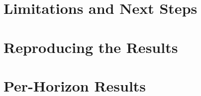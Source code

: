 \documentclass[11pt]{article}
\begin{document}
\section{Limitations and Next Steps}
\label{sec:limits}


\appendix
\section{Reproducing the Results}
\label{app:repro}


\clearpage
\section{Per-Horizon Results}
\label{app:horizon}




\end{document}
